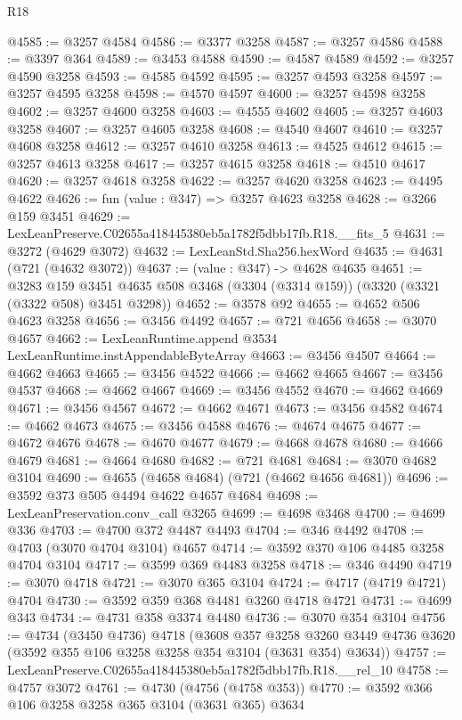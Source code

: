 \begin{lexlean}{R18}
\begin{coremodule}
@4585 := @3257 @4584
@4586 := @3377 @3258
@4587 := @3257 @4586
@4588 := @3397 @364
@4589 := @3453 @4588
@4590 := @4587 @4589
@4592 := @3257 @4590 @3258
@4593 := @4585 @4592
@4595 := @3257 @4593 @3258
@4597 := @3257 @4595 @3258
@4598 := @4570 @4597
@4600 := @3257 @4598 @3258
@4602 := @3257 @4600 @3258
@4603 := @4555 @4602
@4605 := @3257 @4603 @3258
@4607 := @3257 @4605 @3258
@4608 := @4540 @4607
@4610 := @3257 @4608 @3258
@4612 := @3257 @4610 @3258
@4613 := @4525 @4612
@4615 := @3257 @4613 @3258
@4617 := @3257 @4615 @3258
@4618 := @4510 @4617
@4620 := @3257 @4618 @3258
@4622 := @3257 @4620 @3258
@4623 := @4495 @4622
@4626 := fun (value : @347) => @3257 @4623 @3258
@4628 := @3266 @159 @3451
@4629 := LexLeanPreserve.C02655a418445380eb5a1782f5dbb17fb.R18.__fits_5
@4631 := @3272 (@4629 @3072)
@4632 := LexLeanStd.Sha256.hexWord
@4635 := @4631 (@721 (@4632 @3072))
@4637 := (value : @347) -> @4628 @4635
@4651 := @3283
    @159
    @3451
    @4635
    @508
    @3468
    (@3304 (@3314 @159))
    (@3320 (@3321 (@3322 @508) @3451 @3298))
@4652 := @3578 @92
@4655 := @4652 @506 @4623 @3258
@4656 := @3456 @4492
@4657 := @721 @4656
@4658 := @3070 @4657
@4662 := LexLeanRuntime.append @3534 LexLeanRuntime.instAppendableByteArray
@4663 := @3456 @4507
@4664 := @4662 @4663
@4665 := @3456 @4522
@4666 := @4662 @4665
@4667 := @3456 @4537
@4668 := @4662 @4667
@4669 := @3456 @4552
@4670 := @4662 @4669
@4671 := @3456 @4567
@4672 := @4662 @4671
@4673 := @3456 @4582
@4674 := @4662 @4673
@4675 := @3456 @4588
@4676 := @4674 @4675
@4677 := @4672 @4676
@4678 := @4670 @4677
@4679 := @4668 @4678
@4680 := @4666 @4679
@4681 := @4664 @4680
@4682 := @721 @4681
@4684 := @3070 @4682 @3104
@4690 := @4655 (@4658 @4684) (@721 (@4662 @4656 @4681))
@4696 := @3592 @373 @505 @4494 @4622 @4657 @4684
@4698 := LexLeanPreservation.conv_call @3265
@4699 := @4698 @3468
@4700 := @4699 @336
@4703 := @4700 @372 @4487 @4493
@4704 := @346 @4492
@4708 := @4703 (@3070 @4704 @3104) @4657
@4714 := @3592 @370 @106 @4485 @3258 @4704 @3104
@4717 := @3599 @369 @4483 @3258
@4718 := @346 @4490
@4719 := @3070 @4718
@4721 := @3070 @365 @3104
@4724 := @4717 (@4719 @4721) @4704
@4730 := @3592 @359 @368 @4481 @3260 @4718 @4721
@4731 := @4699 @343
@4734 := @4731 @358 @3374 @4480
@4736 := @3070 @354 @3104
@4756 := @4734
    (@3450 @4736)
    @4718
    (@3608
      @357
      @3258
      @3260
      @3449
      @4736
      @3620
      (@3592 @355 @106 @3258 @3258 @354 @3104 (@3631 @354) @3634))
@4757 := LexLeanPreserve.C02655a418445380eb5a1782f5dbb17fb.R18.__rel_10
@4758 := @4757 @3072
@4761 := @4730 (@4756 (@4758 @353))
@4770 := @3592 @366 @106 @3258 @3258 @365 @3104 (@3631 @365) @3634

\end{coremodule}
\end{lexlean}
